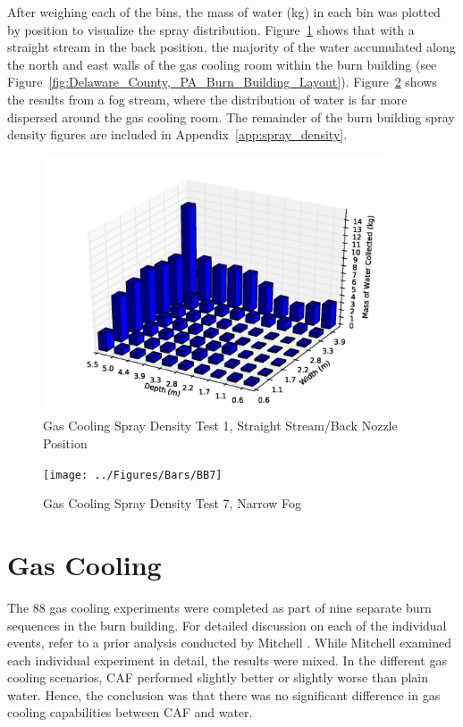 \documentclass[12pt,oneside]{book}
\begin{document}
After weighing each of the bins, the mass of water (kg) in each bin was plotted by position to visualize the spray distribution. Figure~\ref{fig:Burn_Building_Test_1} shows that with a straight stream in the back position, the majority of the water accumulated along the north and east walls of the gas cooling room within the burn building (see Figure~\ref{fig:Delaware_County,_PA_Burn_Building_Layout}). Figure~\ref{fig:Burn_Building_Test_7} shows the results from a fog stream, where the distribution of water is far more dispersed around the gas cooling room. The remainder of the burn building spray density figures are included in Appendix~\ref{app:spray_density}.

\begin{figure}[!ht]
	\includegraphics[width=4in]{../Figures/Bars/BB1}
	\caption{Gas Cooling Spray Density Test 1, Straight Stream/Back Nozzle Position}
	\label{fig:Burn_Building_Test_1}
\end{figure}

\begin{figure}[!ht]
	\texttt{[image: ../Figures/Bars/BB7]}
	\caption{Gas Cooling Spray Density Test 7, Narrow Fog} 
	\label{fig:Burn_Building_Test_7}
\end{figure}

\clearpage

\section{Gas Cooling}
\label{sec:Gas_Cooling}

The 88 gas cooling experiments were completed as part of nine separate burn sequences in the burn building. For detailed discussion on each of the individual events, refer to a prior analysis conducted by Mitchell \cite{Mitchell:1}. While Mitchell examined each individual experiment in detail, the results were mixed. In the different gas cooling scenarios, CAF performed slightly better or slightly worse than plain water. Hence, the conclusion was that there was no significant difference in gas cooling capabilities between CAF and water. 
\end{document}
